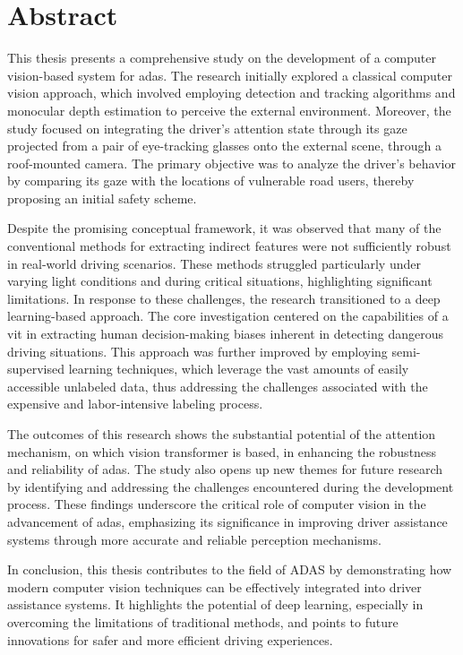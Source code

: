 \thispagestyle{empty}
\section*{Abstract}
\vspace{0.5cm}
This thesis presents a comprehensive study on the development of a computer 
vision-based system for \acf{adas}. The research 
initially explored a classical computer vision approach, which involved 
employing detection and tracking algorithms and monocular depth estimation
to perceive the external environment. Moreover, the study focused on 
integrating the driver’s attention state through its gaze projected from a pair 
of eye-tracking glasses onto the external scene, through a roof-mounted camera.
The primary objective was to analyze the driver's behavior by comparing 
its gaze with the locations of vulnerable road users, thereby proposing 
an initial safety scheme.

Despite the promising conceptual framework, it was observed that many of the 
conventional methods for extracting indirect features were not sufficiently 
robust in real-world driving scenarios. These methods struggled particularly 
under varying light conditions and during critical situations, highlighting 
significant limitations. In response to these challenges, the research 
transitioned to a deep learning-based approach. The core investigation centered 
on the capabilities of a \acf{vit} in extracting human decision-making 
biases inherent in detecting dangerous driving situations.
This approach was further improved by 
employing semi-supervised learning techniques, which leverage the 
vast amounts of easily accessible unlabeled data, thus 
addressing the challenges associated with the expensive and labor-intensive 
labeling process.

The outcomes of this research shows the substantial potential of 
the attention mechanism, on which vision transformer is based, in enhancing 
the robustness 
and reliability of \acs{adas}. The study also opens up new themes for future 
research by identifying and addressing the challenges encountered during the 
development process. These findings underscore the critical role of computer 
vision in the advancement of \acs{adas}, emphasizing its significance in improving 
driver assistance systems through more accurate and reliable perception 
mechanisms.

In conclusion, this thesis contributes to the field of ADAS by demonstrating 
how modern computer vision techniques can be effectively integrated into driver 
assistance systems. It highlights the potential of deep 
learning, especially in overcoming the limitations of traditional methods, and 
points to future innovations for safer and more 
efficient driving experiences.

\afterpage{\blankpage}
